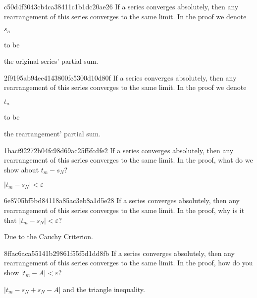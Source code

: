 \begin{note}{c50d4f3043cb4ca38411c1b1dc20ae26}
    If a series converges absolutely, then any rearrangement of this series converges to the same limit.
    In the proof we denote \begin{icloze}{2}\({ s_n }\)\end{icloze} to be \begin{icloze}{1}the original series' partial sum.\end{icloze}
\end{note}

\begin{note}{2f9195ab94ee4143800fc5300d10d80f}
    If a series converges absolutely, then any rearrangement of this series converges to the same limit.
    In the proof we denote \begin{icloze}{2}\({ t_n }\)\end{icloze} to be \begin{icloze}{1}the rearrangement' partial sum.\end{icloze}
\end{note}

\begin{note}{1bacf92272b04fc98d69ac25f5fcdfe2}
    If a series converges absolutely, then any rearrangement of this series converges to the same limit.
    In the proof, what do we show about \({ t_m - s_N }\)?

    \begin{cloze}{1}
        \({ \left\lvert t_m - s_N \right\rvert < \varepsilon }\)
    \end{cloze}
\end{note}

\begin{note}{6e8705bf5bd84118a85ac3eb8a1d5e28}
    If a series converges absolutely, then any rearrangement of this series converges to the same limit.
    In the proof, why is it that \({ \left\lvert t_m - s_N \right\rvert < \varepsilon }\)?

    \begin{cloze}{1}
        Due to the Cauchy Criterion.
    \end{cloze}
\end{note}

\begin{note}{8ffac6aca55141b29861f55f5d1dd8fb}
    If a series converges absolutely, then any rearrangement of this series converges to the same limit.
    In the proof, how do you show \({ \left\lvert t_m - A \right\rvert < \varepsilon }\)?

    \begin{cloze}{1}
        \({ \left\lvert t_m - s_N + s_N - A \right\rvert }\) and the triangle inequality.
    \end{cloze}
\end{note}


